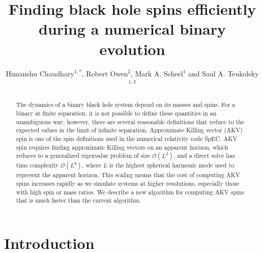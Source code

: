 \documentclass{iopjournal}
\begin{document}
\pagestyle{plain}

\title{Finding black hole spins efficiently during a numerical binary evolution}

\author{Himanshu Chaudhary$^{1,*}$, Robert Owen$^2$, Mark A. Scheel$^1$ and Saul A. Teukolsky$^{1,3}$}




\begin{abstract}

The dynamics of a binary black hole system depend on its masses and spins. For a binary at finite separation, it is not possible to define these quantities in an unambiguous way; however, there are several reasonable definitions that reduce to the expected values in the limit of infinite separation. Approximate Killing vector (AKV) spin is one of the spin definitions used in the numerical relativity code SpEC. AKV spin requires finding approximate Killing vectors on an apparent horizon, which reduces to a generalized eigenvalue problem of size $\mathcal{O}(L^2)$, and a direct solve has time complexity $\mathcal{O}(L^6)$, where $L$ is the highest spherical harmonic mode used to represent the apparent horizon. This scaling means that the cost of computing AKV spins increases rapidly as we simulate systems at higher resolutions, especially those with high spin or mass ratios. We describe a new algorithm for computing AKV spins that is much faster than the current algorithm.

\end{abstract}


\section{\label{sec:Introduction} Introduction}
\end{document}
